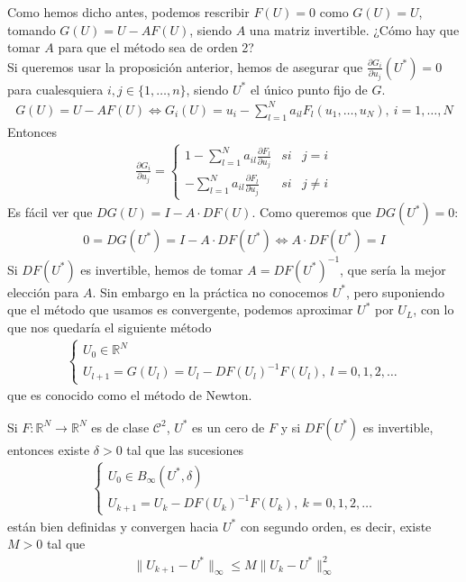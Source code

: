 \begin{obs}
Como hemos dicho antes, podemos rescribir $F(U) = 0$ como $G(U) = U$, tomando $G(U) = U -AF(U)$, siendo $A$ una matriz invertible. ¿Cómo hay que tomar $A$ para que el método sea de orden 2?
\\
\newline
Si queremos usar la proposición anterior, hemos de asegurar que $\frac{\partial G_i}{\partial u_j}(U^*) = 0$ para cualesquiera $i,j \in \{1,\ldots,n\}$, siendo $U^*$ el único punto fijo de $G$.
\begin{align*}
    G(U) = U - AF(U) \Longleftrightarrow G_i(U) = u_i - \sum_{l=1}^{N}a_{il}F_l(u_1,\ldots,u_N), \ i = 1,\ldots,N
\end{align*}
Entonces
\begin{align*}
    \frac{\partial G_i}{\partial u_j} = \left\{ \begin{array}{lcc}
             1 - \sum_{l=1}^{N} a_{il} \frac{\partial F_l}{\partial u_j} & si & j = i\\
             - \sum_{l=1}^{N} a_{il} \frac{\partial F_l}{\partial u_j} & si & j \not = i
             \end{array}
   \right.
\end{align*}
Es fácil ver que $DG(U) = I - A \cdot DF(U)$. Como queremos que $DG(U^*) = 0$:
\begin{align*}
    0 = DG(U^*) = I - A \cdot DF(U^*) \Longleftrightarrow A \cdot DF(U^*) = I
\end{align*}
Si $DF(U^*)$ es invertible, hemos de tomar $A = DF(U^*)^{-1}$, que sería la mejor elección para $A$. Sin embargo en la práctica no conocemos $U^*$, pero suponiendo que el método que usamos es convergente, podemos aproximar $U^*$ por $U_L$, con lo que nos quedaría el siguiente método
\begin{align*}
            \left\{ \begin{array}{lcc}
             U_0 \in \mathbb{R}^N\\
             U_{l+1} = G(U_l) = U_l - DF(U_l)^{-1} F(U_l), \ l = 0,1,2,\ldots
             \end{array}
   \right.
\end{align*}
que es conocido como el método de Newton.
\end{obs}

\begin{teo}
Si $F : \mathbb{R}^N \longrightarrow \mathbb{R}^N$ es de clase $\mathscr{C}^2$, $U^*$ es un cero de $F$ y si $DF(U^*)$ es invertible, entonces existe $\delta > 0$ tal que las sucesiones
\begin{align*}
            \left\{ \begin{array}{lcc}
             U_0 \in B_{\infty}(U^*,\delta)\\
             U_{k+1} = U_k- DF(U_k)^{-1} F(U_k), \ k = 0,1,2,\ldots
             \end{array}
   \right.
\end{align*}
están bien definidas y convergen hacia $U^*$ con segundo orden, es decir, existe $M > 0$ tal que
\begin{align*}
    \|U_{k+1} - U^*\|_{\infty} \leq M \| U_k - U^*\|_{\infty}^2
\end{align*}
\end{teo}

